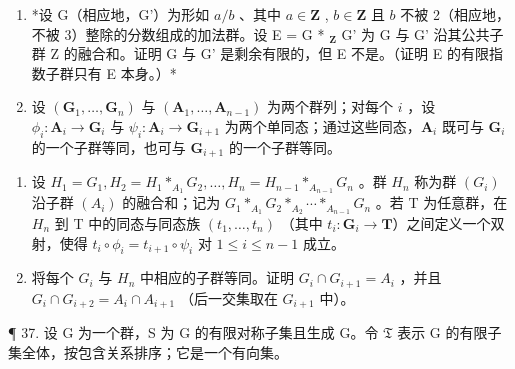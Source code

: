 \begin{enumerate}
\def\labelenumi{\arabic{enumi}.}
\setcounter{enumi}{34}
\item
  *设 G（相应地，G'）为形如 \(a/b\) 、其中 \(a \in \mathbf{Z}\) , \(b \in \mathbf{Z}\) 且 \(b\) 不被 2（相应地，不被 3）整除的分数组成的加法群。设 E = G * \(_{\mathbf{Z}}\) G' 为 G 与 G' 沿其公共子群 Z 的融合和。证明 G 与 G' 是剩余有限的，但 E 不是。（证明 E 的有限指数子群只有 E 本身。）*
\item
  设 \((\mathbf{G}_1, \ldots, \mathbf{G}_n)\) 与 \((\mathbf{A}_1, \ldots, \mathbf{A}_{n-1})\) 为两个群列；对每个 \(i\) ，设 \(\phi_i: \mathbf{A}_i \to \mathbf{G}_i\) 与 \(\psi_i: \mathbf{A}_i \to \mathbf{G}_{i+1}\) 为两个单同态；通过这些同态，\(\mathbf{A}_i\) 既可与 \(\mathbf{G}_i\) 的一个子群等同，也可与 \(\mathbf{G}_{i+1}\) 的一个子群等同。
\end{enumerate}

\begin{enumerate}
\def\labelenumi{(\alph{enumi})}
\item
  设 \(H_{1}=G_{1}, H_{2}=H_{1} *_{A_{1}} G_{2}, \ldots, H_{n}=H_{n-1} *_{A_{n-1}} G_{n}\) 。群 \(H_{n}\) 称为群 \((G_{i})\) 沿子群 \((A_{i})\) 的融合和；记为 \(G_{1} *_{A_{1}} G_{2} *_{A_{2}} \cdots *_{A_{n-1}} G_{n}\) 。若 T 为任意群，在 \(H_{n}\) 到 T 中的同态与同态族 \((t_{1},\ldots ,t_{n})\) （其中 \(t_i\colon \mathbf{G}_i\to \mathbf{T}\)）之间定义一个双射，使得 \(t_i\circ \phi_i = t_{i + 1}\circ \psi_i\) 对 \(1\leqslant i\leqslant n - 1\) 成立。
\item
  将每个 \(G_{i}\) 与 \(H_{n}\) 中相应的子群等同。证明 \(G_{i} \cap G_{i+1} = A_{i}\) ，并且 \(G_{i} \cap G_{i+2} = A_{i} \cap A_{i+1}\) （后一交集取在 \(G_{i+1}\) 中）。
\end{enumerate}

¶ 37. 设 G 为一个群，S 为 G 的有限对称子集且生成 G。令 \(\mathfrak{T}\) 表示 G 的有限子集全体，按包含关系排序；它是一个有向集。

